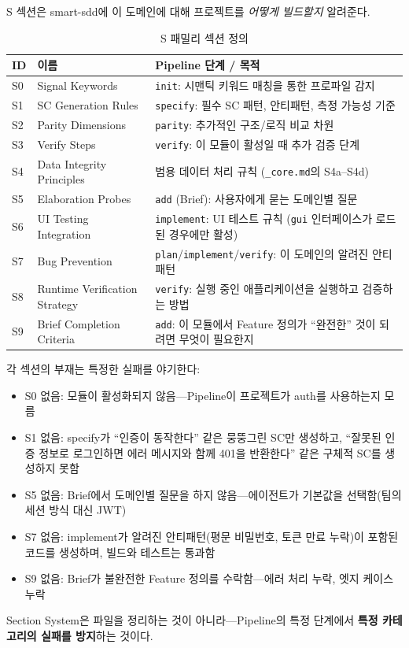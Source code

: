 \documentclass[11pt,a4paper,openright,twoside]{report}
\begin{document}
S 섹션은 smart-sdd에 이 도메인에 대해 프로젝트를 \emph{어떻게 빌드할지} 알려준다.

\begin{table}[H]
\centering
\caption{S 패밀리 섹션 정의}
\label{tab:s-sections}
\begin{tabularx}{\textwidth}{llX}
\toprule
\textbf{ID} & \textbf{이름} & \textbf{Pipeline 단계 / 목적} \\
\midrule
S0 & Signal Keywords & \texttt{init}: 시맨틱 키워드 매칭을 통한 프로파일 감지 \\
S1 & SC Generation Rules & \texttt{specify}: 필수 SC 패턴, 안티패턴, 측정 가능성 기준 \\
S2 & Parity Dimensions & \texttt{parity}: 추가적인 구조/로직 비교 차원 \\
S3 & Verify Steps & \texttt{verify}: 이 모듈이 활성일 때 추가 검증 단계 \\
S4 & Data Integrity Principles & 범용 데이터 처리 규칙 (\texttt{\_core.md}의 S4a--S4d) \\
S5 & Elaboration Probes & \texttt{add} (Brief): 사용자에게 묻는 도메인별 질문 \\
S6 & UI Testing Integration & \texttt{implement}: UI 테스트 규칙 (\texttt{gui} 인터페이스가 로드된 경우에만 활성) \\
S7 & Bug Prevention & \texttt{plan}/\texttt{implement}/\texttt{verify}: 이 도메인의 알려진 안티패턴 \\
S8 & Runtime Verification Strategy & \texttt{verify}: 실행 중인 애플리케이션을 실행하고 검증하는 방법 \\
S9 & Brief Completion Criteria & \texttt{add}: 이 모듈에서 Feature 정의가 ``완전한'' 것이 되려면 무엇이 필요한지 \\
\bottomrule
\end{tabularx}
\end{table}

\begin{warnbox}
각 섹션의 부재는 특정한 실패를 야기한다:
\begin{itemize}[nosep]
\item S0 없음: 모듈이 활성화되지 않음---Pipeline이 프로젝트가 auth를 사용하는지 모름
\item S1 없음: specify가 ``인증이 동작한다'' 같은 뭉뚱그린 SC만 생성하고, ``잘못된 인증 정보로 로그인하면 에러 메시지와 함께 401을 반환한다'' 같은 구체적 SC를 생성하지 못함
\item S5 없음: Brief에서 도메인별 질문을 하지 않음---에이전트가 기본값을 선택함(팀의 세션 방식 대신 JWT)
\item S7 없음: implement가 알려진 안티패턴(평문 비밀번호, 토큰 만료 누락)이 포함된 코드를 생성하며, 빌드와 테스트는 통과함
\item S9 없음: Brief가 불완전한 Feature 정의를 수락함---에러 처리 누락, 엣지 케이스 누락
\end{itemize}
Section System은 파일을 정리하는 것이 아니라---Pipeline의 특정 단계에서 \textbf{특정 카테고리의 실패를 방지}하는 것이다.
\end{warnbox}
\end{document}
